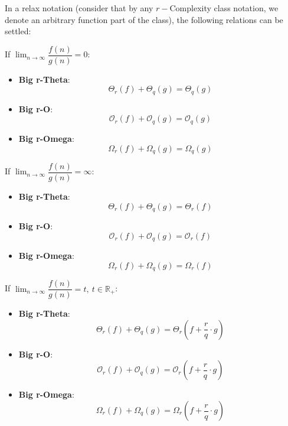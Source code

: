 In a relax notation (consider that by any  $r-$Complexity class notation, we denote an arbitrary function part of the class), the following relations can be settled:


If $\lim_{n\to\infty} \dfrac{f(n)}{g(n)} = 0$:
\begin{itemize}
  \item \textbf{Big r-Theta}: 
  \[  \Theta_{r}(f) + \Theta_{q}(g) = \Theta_{q}(g)\]
  \item \textbf{Big r-O}: 
  \[  \mathcal{O}_{r}(f) + \mathcal{O}_{q}(g) = \mathcal{O}_{q}(g)\]
  \item \textbf{Big r-Omega}: 
  \[  \Omega_{r}(f) + \Omega_{q}(g) = \Omega_{q}(g)\]
\end{itemize}


If $\lim_{n\to\infty} \dfrac{f(n)}{g(n)} = \infty$:
\begin{itemize}
  \item \textbf{Big r-Theta}: 
  \[  \Theta_{r}(f) + \Theta_{q}(g) = \Theta_{r}(f)\]
  \item \textbf{Big r-O}: 
  \[  \mathcal{O}_{r}(f) + \mathcal{O}_{q}(g) = \mathcal{O}_{r}(f)\]
  \item \textbf{Big r-Omega}: 
  \[  \Omega_{r}(f) + \Omega_{q}(g) = \Omega_{r}(f)\]
\end{itemize}

If $\lim_{n\to\infty} \dfrac{f(n)}{g(n)} = t, \ t \in \mathbb{R}_{+}$:
\begin{itemize}
  \item \textbf{Big r-Theta}: 
  \[  \Theta_{r}(f) + \Theta_{q}(g) = \Theta_{r}(f + \dfrac{r}{q} \cdot g)\]
  \item \textbf{Big r-O}: 
  \[  \mathcal{O}_{r}(f) + \mathcal{O}_{q}(g) = \mathcal{O}_{r}(f + \dfrac{r}{q} \cdot g)\]
  \item \textbf{Big r-Omega}: 
  \[  \Omega_{r}(f) + \Omega_{q}(g) = \Omega_{r}(f + \dfrac{r}{q} \cdot g)\]
\end{itemize}
